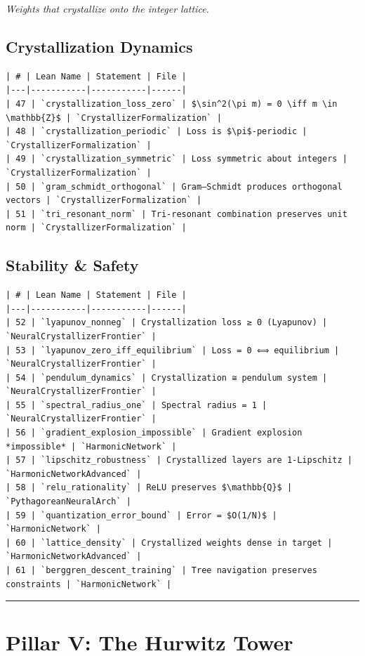 \documentclass[12pt,a4paper,openany]{book}
\begin{document}
\textit{Weights that crystallize onto the integer lattice.}

\subsection{Crystallization Dynamics}

\begin{verbatim}
| # | Lean Name | Statement | File |
|---|-----------|-----------|------|
| 47 | `crystallization_loss_zero` | $\sin^2(\pi m) = 0 \iff m \in \mathbb{Z}$ | `CrystallizerFormalization` |
| 48 | `crystallization_periodic` | Loss is $\pi$-periodic | `CrystallizerFormalization` |
| 49 | `crystallization_symmetric` | Loss symmetric about integers | `CrystallizerFormalization` |
| 50 | `gram_schmidt_orthogonal` | Gram–Schmidt produces orthogonal vectors | `CrystallizerFormalization` |
| 51 | `tri_resonant_norm` | Tri-resonant combination preserves unit norm | `CrystallizerFormalization` |
\end{verbatim}

\subsection{Stability \& Safety}

\begin{verbatim}
| # | Lean Name | Statement | File |
|---|-----------|-----------|------|
| 52 | `lyapunov_nonneg` | Crystallization loss ≥ 0 (Lyapunov) | `NeuralCrystallizerFrontier` |
| 53 | `lyapunov_zero_iff_equilibrium` | Loss = 0 ⟺ equilibrium | `NeuralCrystallizerFrontier` |
| 54 | `pendulum_dynamics` | Crystallization ≅ pendulum system | `NeuralCrystallizerFrontier` |
| 55 | `spectral_radius_one` | Spectral radius = 1 | `NeuralCrystallizerFrontier` |
| 56 | `gradient_explosion_impossible` | Gradient explosion *impossible* | `HarmonicNetwork` |
| 57 | `lipschitz_robustness` | Crystallized layers are 1-Lipschitz | `HarmonicNetworkAdvanced` |
| 58 | `relu_rationality` | ReLU preserves $\mathbb{Q}$ | `PythagoreanNeuralArch` |
| 59 | `quantization_error_bound` | Error = $O(1/N)$ | `HarmonicNetwork` |
| 60 | `lattice_density` | Crystallized weights dense in target | `HarmonicNetworkAdvanced` |
| 61 | `berggren_descent_training` | Tree navigation preserves constraints | `HarmonicNetwork` |
\end{verbatim}

\bigskip\hrule\bigskip

\section{Pillar V: The Hurwitz Tower}
\end{document}
